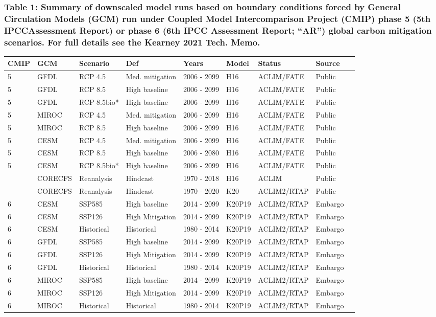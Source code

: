 \documentclass[
]{article}
\begin{document}
\hypertarget{table-1-summary-of-downscaled-model-runs-based-on-boundary-conditions-forced-by-general-circulation-models-gcm-run-under-coupled-model-intercomparison-project-cmip-phase-5-5th-ipccassessment-report-or-phase-6-6th-ipcc-assessment-report-ar-global-carbon-mitigation-scenarios.-for-full-details-see-the-kearney-2021-tech.-memo.}{%
\subsubsection{Table 1: Summary of downscaled model runs based on
boundary conditions forced by General Circulation Models (GCM) run under
Coupled Model Intercomparison Project (CMIP) phase 5 (5th IPCCAssessment
Report) or phase 6 (6th IPCC Assessment Report; ``AR'') global carbon
mitigation scenarios. For full details see the Kearney 2021 Tech.
Memo.}\label{table-1-summary-of-downscaled-model-runs-based-on-boundary-conditions-forced-by-general-circulation-models-gcm-run-under-coupled-model-intercomparison-project-cmip-phase-5-5th-ipccassessment-report-or-phase-6-6th-ipcc-assessment-report-ar-global-carbon-mitigation-scenarios.-for-full-details-see-the-kearney-2021-tech.-memo.}}

\begin{longtable}[]{@{}lllllllll@{}}
\toprule
CMIP & GCM & Scenario & Def & Years & Model & Status & Source
&\tabularnewline
\midrule
\endhead
5 & GFDL & RCP 4.5 & Med. mitigation & 2006 - 2099 & H16 & ACLIM/FATE &
Public &\tabularnewline
5 & GFDL & RCP 8.5 & High baseline & 2006 - 2099 & H16 & ACLIM/FATE &
Public &\tabularnewline
5 & GFDL & RCP 8.5bio* & High baseline & 2006 - 2099 & H16 & ACLIM/FATE
& Public &\tabularnewline
5 & MIROC & RCP 4.5 & Med. mitigation & 2006 - 2099 & H16 & ACLIM/FATE &
Public &\tabularnewline
5 & MIROC & RCP 8.5 & High baseline & 2006 - 2099 & H16 & ACLIM/FATE &
Public &\tabularnewline
5 & CESM & RCP 4.5 & Med. mitigation & 2006 - 2099 & H16 & ACLIM/FATE &
Public &\tabularnewline
5 & CESM & RCP 8.5 & High baseline & 2006 - 2080 & H16 & ACLIM/FATE &
Public &\tabularnewline
5 & CESM & RCP 8.5bio* & High baseline & 2006 - 2099 & H16 & ACLIM/FATE
& Public &\tabularnewline
& CORECFS & Reanalysis & Hindcast & 1970 - 2018 & H16 & ACLIM & Public
&\tabularnewline
& CORECFS & Reanalysis & Hindcast & 1970 - 2020 & K20 & ACLIM2/RTAP &
Public &\tabularnewline
6 & CESM & SSP585 & High baseline & 2014 - 2099 & K20P19 & ACLIM2/RTAP &
Embargo &\tabularnewline
6 & CESM & SSP126 & High Mitigation & 2014 - 2099 & K20P19 & ACLIM2/RTAP
& Embargo &\tabularnewline
6 & CESM & Historical & Historical & 1980 - 2014 & K20P19 & ACLIM2/RTAP
& Embargo &\tabularnewline
6 & GFDL & SSP585 & High baseline & 2014 - 2099 & K20P19 & ACLIM2/RTAP &
Embargo &\tabularnewline
6 & GFDL & SSP126 & High Mitigation & 2014 - 2099 & K20P19 & ACLIM2/RTAP
& Embargo &\tabularnewline
6 & GFDL & Historical & Historical & 1980 - 2014 & K20P19 & ACLIM2/RTAP
& Embargo &\tabularnewline
6 & MIROC & SSP585 & High baseline & 2014 - 2099 & K20P19 & ACLIM2/RTAP
& Embargo &\tabularnewline
6 & MIROC & SSP126 & High Mitigation & 2014 - 2099 & K20P19 &
ACLIM2/RTAP & Embargo &\tabularnewline
6 & MIROC & Historical & Historical & 1980 - 2014 & K20P19 & ACLIM2/RTAP
& Embargo &\tabularnewline
\bottomrule
\end{longtable}
\end{document}
